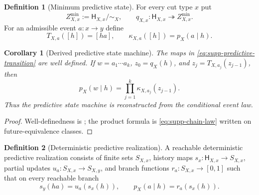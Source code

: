 \documentclass[11pt]{article}
\newtheorem{corollary}[corollary]{Corollary}
\theoremstyle{definition}
\newtheorem{definition}[definition]{Definition}
\theoremstyle{remark}
\begin{document}
\begin{definition}[Minimum predictive state]
\label{def:supp-predictive-state}
For every cut type $x$ put
\begin{equation}
 \boxed{
 Z_{X,x}^{\min}:=\mathsf H_{X,x}/\!\sim_X,
 \qquad
 q_{X,x}:\mathsf H_{X,x}\twoheadrightarrow Z_{X,x}^{\min}.}
 \label{eq:supp-predictive-state}
\end{equation}
For an admissible event $a:x\to y$ define
\begin{equation}
 \boxed{
 T_{X,a}([h])=[ha],
 \qquad
 \kappa_{X,a}([h])=p_X(a\mid h).}
 \label{eq:supp-predictive-transition}
\end{equation}
\end{definition}

\begin{corollary}[Derived predictive state machine]
\label{cor:supp-derived-state-machine}
The maps in \eqref{eq:supp-predictive-transition} are well defined.  If
$w=a_1\cdots a_k$, $z_0=q_X(h)$, and
$z_j=T_{X,a_j}(z_{j-1})$, then
\begin{equation}
 \boxed{
 p_X(w\mid h)=\prod_{j=1}^{k}\kappa_{X,a_j}(z_{j-1}).}
 \label{eq:supp-state-factorization}
\end{equation}
Thus the predictive state machine is reconstructed from the conditional event
law.
\end{corollary}

\begin{proof}
Well-definedness is ; the product formula is
\eqref{eq:supp-chain-law} written on future-equivalence classes.
\end{proof}

\begin{definition}[Deterministic predictive realization]
\label{def:supp-predictive-realization}
A reachable deterministic predictive realization consists of finite sets
$S_{X,x}$, history maps $s_x:\mathsf H_{X,x}\to S_{X,x}$, partial updates
$u_a:S_{X,x}\to S_{X,y}$, and branch functions
$r_a:S_{X,x}\to[0,1]$ such that on every reachable branch
\begin{equation}
 s_y(ha)=u_a(s_x(h)),
 \qquad
 p_X(a\mid h)=r_a(s_x(h)).
 \label{eq:supp-realization}
\end{equation}
\end{definition}
\end{document}
